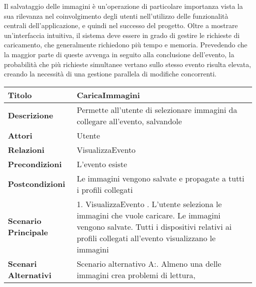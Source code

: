 Il salvataggio delle immagini è un'operazione di particolare importanza vista la sua rilevanza
nel coinvolgimento degli utenti nell'utilizzo delle funzionalità centrali dell'applicazione, e quindi nel successo del progetto.
Oltre a mostrare un'interfaccia intuitiva, il sistema deve essere in grado di gestire le richieste di caricamento, 
che generalmente richiedono più tempo e memoria. 
Prevedendo che la maggior parte di queste avvenga in seguito alla conclusione dell'evento, 
la probabilità che più richieste simultanee vertano sullo stesso evento risulta elevata,
creando la necessità di una gestione parallela di modifiche concorrenti.

\begin{table}[htb]
    \begin{tabular} {|P{4.5cm}|P{11cm}|}
        \hline
        \textbf{Titolo}                   & CaricaImmagini                                                                  \\
        \hline
        \textbf{Descrizione}              & Permette all'utente di selezionare immagini da collegare all'evento, salvandole \\
        \hline
        \textbf{Attori}                   & Utente                                                                          \\
        \hline
        \textbf{Relazioni}                & VisualizzaEvento                                                                \\
        \hline
        \textbf{Precondizioni}            & L'evento esiste                                                                 \\
        \hline
        \textbf{Postcondizioni}           & Le immagini vengono salvate e propagate a tutti i profili collegati             \\
        \hline
        \textbf{Scenario Principale}      & 1. VisualizzaEvento . L'utente seleziona le immagini che vuole caricare. Le immagini vengono salvate. Tutti i dispositivi relativi ai profili collegati all'evento visualizzano le immagini                            \\
        \hline
        \textbf{Scenari Alternativi}      &
        Scenario alternativo A:. Almeno una delle immagini crea problemi di lettura,

\end{tabular}
\end{table}
